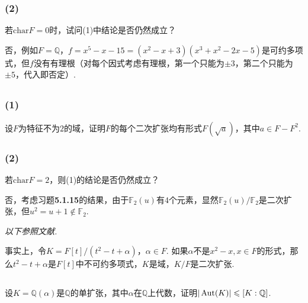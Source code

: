 \subsubsection{(2)}
若$\mathrm{char}F=0$时，试问(1)中结论是否仍然成立？

\jie 否，例如$F=\mathbb{Q}$，$f=x^5-x-15=(x^2-x+3)(x^3+x^2-2x-5)$是可约多项式，但$f$没有有理根（对每个因式考虑有理根，第一个只能为$\pm3$，第二个只能为$\pm5$，代入即否定）.

\subsection{}
\subsubsection{(1)}
设$F$为特征不为$2$的域，证明$F$的每个二次扩张均有形式$F(\sqrt{a})$，其中$a\in F-F^2$.

\subsubsection{(2)}
若$\mathrm{char}F=2$，则(1)的结论是否仍然成立？

\jie 否，考虑{\heiti 习题}\textbf{5.1.15}的结果，由于$\mathbb{F}_2(u)$有$4$个元素，显然$\mathbb{F}_2(u)/\mathbb{F}_2$是二次扩张，但$u^2=u+1\notin \mathbb{F}_2$.

\emph{以下参照文献}\cite{290032}\emph{.}

事实上，令$K=F[t]/(t^2-t+\alpha)$，$\alpha\in F$. 如果$\alpha$不是$x^2-x, x\in F$的形式，那么$t^2-t+\alpha$是$F[t]$中不可约多项式，$K$是域，$K/F$是二次扩张.

\subsection{}
设$K=\mathbb{Q}(\alpha)$是$\mathbb{Q}$的单扩张，其中$\alpha$在$\mathbb{Q}$上代数，证明$|\operatorname{Aut}(K)|\leqslant [K:\mathbb{Q}]$.

